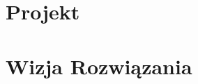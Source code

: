 
\chapter{Projekt}
\label{sec:projekt}


\chapter{Wizja Rozwiązania}
\label{sec:wizja_rozwiazania}



